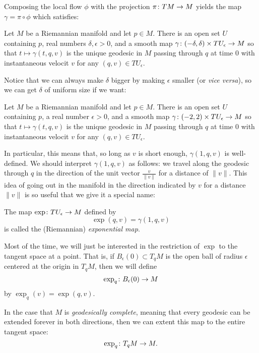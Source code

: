 Composing the local flow $\phi$ with the projection $\pi \colon\thinspace\! TM \to M$ yields the map $\gamma = \pi \circ \phi$ which satisfies:

\begin{proposition}\label{prop:geodesic flow on M}
	Let $M$ be a Riemannian manifold and let $p \in M$. There is an open set $U$ containing $p$, real numbers $\delta,\epsilon > 0$, and a smooth map $\gamma \colon\thinspace\! (-\delta, \delta) \times TU_\epsilon \to M$ so that $t \mapsto \gamma(t,q,v)$ is the unique geodesic in $M$ passing through $q$ at time 0 with instantaneous velocit $v$ for any $(q,v) \in TU_\epsilon$.
\end{proposition}

Notice that we can always make $\delta$ bigger by making $\epsilon$ smaller (or \emph{vice versa}), so we can get $\delta$ of uniform size if we want:

\begin{corollary}\label{cor:geodesic flow fixed delta}
	Let $M$ be a Riemannian manifold and let $p \in M$. There is an open set $U$ containing $p$, a real number $\epsilon > 0$, and a smooth map $\gamma \colon\thinspace\! (-2,2) \times TU_\epsilon \to M$ so that $t \mapsto \gamma(t,q,v)$ is the unique geodesic in $M$ passing through $q$ at time 0 with instantaneous velocit $v$ for any $(q,v) \in TU_\epsilon$.
\end{corollary}

In particular, this means that, so long as $v$ is short enough, $\gamma(1,q,v)$ is well-defined. We should interpret $\gamma(1,q,v)$ as follows: we travel along the geodesic through $q$ in the direction of the unit vector $\frac{v}{\|v\|}$ for a distance of $\|v\|$. This idea of going out in the manifold in the direction indicated by $v$ for a distance $\|v\|$ is so useful that we give it a special name:

\begin{definition}\label{def:Riemannian exponential}
	The map $\exp \colon\thinspace\! TU_\epsilon \to M$ defined by
	\[
		\exp(q,v) = \gamma(1,q,v)
	\]
	is called the (Riemannian) \emph{exponential map}.
\end{definition}

Most of the time, we will just be interested in the restriction of $\exp$ to the tangent space at a point. That is, if $B_\epsilon(0) \subset T_q M$ is the open ball of radius $\epsilon$ centered at the origin in $T_qM$, then we will define
\[
	\exp_q \colon\thinspace\! B_\epsilon(0) \to M
\]
by $\exp_q(v) = \exp(q,v)$.

In the case that $M$ is \emph{geodesically complete}, meaning that every geodesic can be extended forever in both directions, then we can extent this map to the entire tangent space:
\[
	\exp_q \colon\thinspace\! T_q M \to M.
\]

